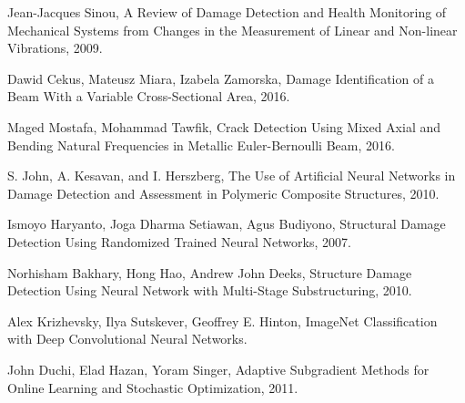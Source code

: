 \documentclass[a4paper,12pt]{article}
\theoremstyle{remark}
\begin{document}
	\newpage
	\begin{thebibliography}{99}
		
		Jean-Jacques Sinou,
		A Review of Damage Detection and Health Monitoring of Mechanical Systems from Changes in the Measurement of Linear and Non-linear Vibrations,
		2009.
		
		Dawid Cekus, Mateusz Miara, Izabela Zamorska,
		Damage Identification of a Beam With a Variable Cross-Sectional Area,
		2016.
		
		Maged Mostafa, Mohammad Tawfik,
		Crack Detection Using Mixed Axial and Bending Natural Frequencies in Metallic Euler-Bernoulli Beam,
		2016.
		
		S. John, A. Kesavan, and I. Herszberg,
		The Use of Artificial Neural Networks in Damage Detection
		and Assessment in Polymeric Composite Structures,
		2010.
		
		Ismoyo Haryanto, Joga Dharma Setiawan, Agus Budiyono,
		Structural Damage Detection Using Randomized Trained Neural Networks,
		2007.
		
		Norhisham Bakhary, Hong Hao, Andrew John Deeks,
		Structure Damage Detection Using Neural Network with Multi-Stage Substructuring,
		2010.
		
		Alex Krizhevsky, Ilya Sutskever, Geoffrey E. Hinton,
		ImageNet Classification with Deep Convolutional Neural Networks.
		
		John Duchi, Elad Hazan, Yoram Singer, Adaptive Subgradient Methods for Online Learning and Stochastic Optimization, 2011.
		
	\end{thebibliography}
\end{document}
